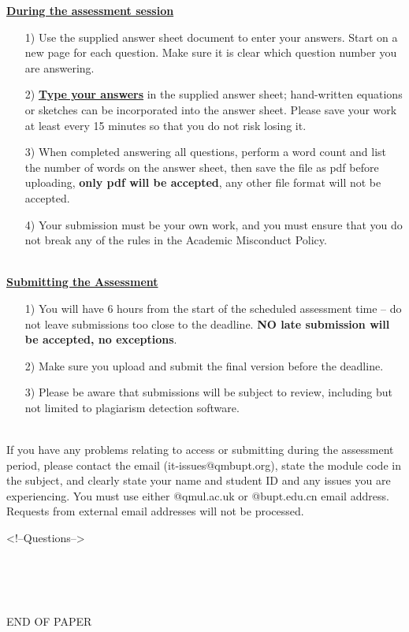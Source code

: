 \documentclass[11pt]{article}
\begin{document}
	\textbf{\underline{During the assessment session}}
	\begin{enumerate}
		\item[1) ] Use the supplied answer sheet document to enter your answers. Start on a new page for each question. Make sure it is clear which question number you are answering.
		\item[2) ] \textbf{\underline{Type your answers}} in the supplied answer sheet; hand-written equations or sketches can be incorporated into the answer sheet. Please save your work at least every 15 minutes so that you do not 
		risk losing it.
		\item[3) ] When completed answering all questions, perform a word count and list the number of words on the answer sheet, then save the file as pdf before uploading, \textbf{only pdf will be accepted}, any other file format will not be accepted.
		\item[4) ] Your submission must be your own work, and you must ensure that you do not break any of the rules in the Academic Misconduct Policy.
	\end{enumerate}
	~\\
	
	\textbf{\underline{Submitting the Assessment}}
	\begin{enumerate}
		\item[1) ] You will have 6 hours from the start of the scheduled assessment time – do not leave submissions too close to the deadline. \textbf{NO late submission will be accepted, no exceptions}.
		\item[2) ] Make sure you upload and submit the final version before the deadline.
		\item[3) ] Please be aware that submissions will be subject to review, including but not limited to plagiarism detection software.
	\end{enumerate}
	~\\
	
	If you have any problems relating to access or submitting during the assessment period, please contact 
	the email (it-issues@qmbupt.org), state the module code in the subject, and clearly state your name 
	and student ID and any issues you are experiencing. You must use either @qmul.ac.uk or 
	@bupt.edu.cn email address. Requests from external email addresses will not be processed.
	
	
	\newpage
	
	\pagestyle{fancy}
	\fancyhf{}
	
	\setcounter{page}{1}
	
	<!--Questions-->
	
	
	~\\~\\~\\
	\begin{center}
		END OF PAPER
	\end{center}
	
	
	\label{unknown}
\end{document}
